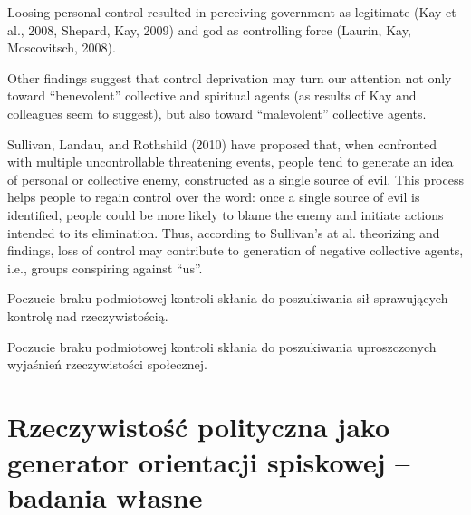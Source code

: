 \documentclass[man]{apa6}
\begin{document}
Loosing personal control resulted in perceiving government as legitimate (Kay et al., 2008, Shepard, Kay, 2009) and god as controlling force (Laurin, Kay, Moscovitsch, 2008).

Other findings suggest that control deprivation may turn our attention not only toward ``benevolent'' collective and spiritual agents (as results of Kay and colleagues seem to suggest), but also toward ``malevolent'' collective agents.

Sullivan, Landau, and Rothshild  (2010) have proposed that, when confronted with multiple uncontrollable threatening events, people tend to generate an idea of personal or collective enemy, constructed as a single source of evil. This process helps people to regain control over the word: once a single source of evil is identified, people could be more likely to blame the enemy and initiate actions intended to its elimination. Thus, according to Sullivan’s at al. theorizing and findings, loss of control may contribute to generation of negative collective agents, i.e., groups conspiring against ``us''.


    Poczucie braku podmiotowej kontroli skłania do poszukiwania sił sprawujących kontrolę nad rzeczywistością.

    Poczucie braku podmiotowej kontroli skłania do poszukiwania uproszczonych wyjaśnień rzeczywistości społecznej.

    \newpage

    \section{Rzeczywistość polityczna jako generator orientacji spiskowej -- badania własne}
\end{document}
